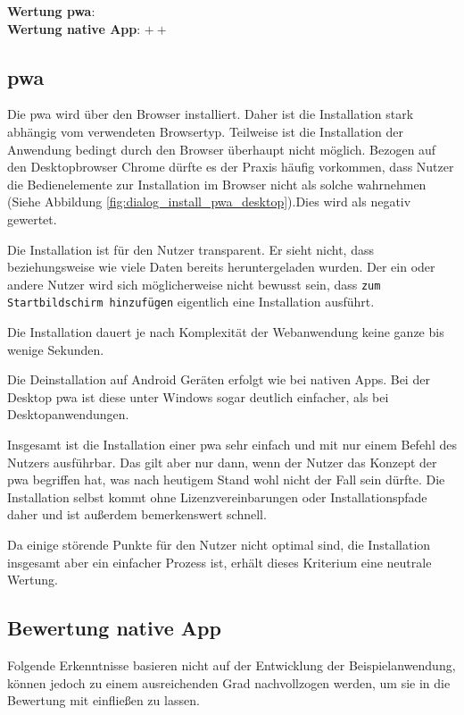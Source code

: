 \textbf{Wertung \ac{pwa}}: \Circle \\
\textbf{Wertung native App}: $++$ \\

\subsection{\ac{pwa}}
Die \ac{pwa} wird über den Browser installiert. Daher ist die Installation stark abhängig vom verwendeten Browsertyp. Teilweise ist die Installation der Anwendung bedingt durch den Browser überhaupt nicht möglich. Bezogen auf den Desktopbrowser Chrome dürfte es der Praxis häufig vorkommen, dass Nutzer die Bedienelemente zur Installation im Browser nicht als solche wahrnehmen (Siehe Abbildung \ref{fig:dialog_install_pwa_desktop}).Dies wird als negativ gewertet.

Die Installation ist für den Nutzer transparent. Er sieht nicht, dass beziehungsweise wie viele Daten bereits heruntergeladen wurden. Der ein oder andere Nutzer wird sich möglicherweise nicht bewusst sein, dass \texttt{zum Startbildschirm hinzufügen} eigentlich eine Installation ausführt.

Die Installation dauert je nach Komplexität der Webanwendung keine ganze bis wenige Sekunden.

Die Deinstallation auf Android Geräten erfolgt wie bei nativen Apps. Bei der Desktop \ac{pwa} ist diese unter Windows sogar deutlich einfacher, als bei Desktopanwendungen.

Insgesamt ist die Installation einer \ac{pwa} sehr einfach und mit nur einem Befehl des Nutzers ausführbar. Das gilt aber nur dann, wenn der Nutzer das Konzept der \ac{pwa} begriffen hat, was nach heutigem Stand wohl nicht der Fall sein dürfte. Die Installation selbst kommt ohne Lizenzvereinbarungen oder Installationspfade daher und ist außerdem bemerkenswert schnell.

Da einige störende Punkte für den Nutzer nicht optimal sind, die Installation insgesamt aber ein einfacher Prozess ist, erhält dieses Kriterium eine neutrale Wertung.


\subsection{Bewertung native App}
Folgende Erkenntnisse basieren nicht auf der Entwicklung der Beispielanwendung, können jedoch zu einem ausreichenden Grad nachvollzogen werden, um sie in die Bewertung mit einfließen zu lassen.

